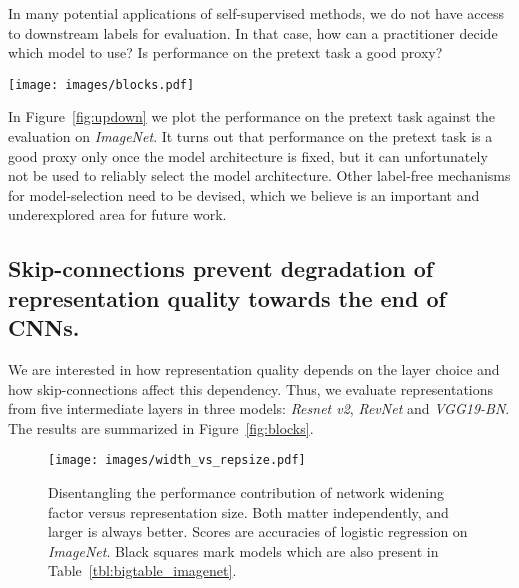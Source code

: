 \documentclass[10pt,twocolumn,letterpaper]{article}
\begin{document}
In many potential applications of self-supervised methods, we do not have access to downstream labels for evaluation.
In that case, how can a practitioner decide which model to use?
Is performance on the pretext task a good proxy?

\begin{figure*}[t]
  \begin{center}
    \texttt{[image: images/blocks.pdf]}
  \end{center}
  \caption{
     Evaluating the representation from various depths within the network.
     The vertical axis corresponds to downstream ImageNet performance in percent.
     For residual architectures, the \emph{pre-logits} are always best.
  }\label{fig:blocks}
\end{figure*}

In Figure~\ref{fig:updown} we plot the performance on the pretext task against the evaluation on \emph{ImageNet}.
It turns out that performance on the pretext task is a good proxy only once the model architecture is fixed, but it can unfortunately not be used to reliably select the model architecture.
Other label-free mechanisms for model-selection need to be devised, which we believe is an important and underexplored area for future work.

\subsection{Skip-connections prevent degradation of representation quality towards the end of CNNs.}
\label{subsec:layers}


We are interested in how representation quality depends on the layer choice and how skip-connections affect this dependency.
Thus, we evaluate representations from five intermediate layers in three models: \emph{Resnet v2}, \emph{RevNet} and \emph{VGG19-BN}.
The results are summarized in Figure~\ref{fig:blocks}.

\begin{figure}[t]
  \begin{center}
    \texttt{[image: images/width\_vs\_repsize.pdf]}
  \end{center}
  \caption{
     Disentangling the performance contribution of network widening factor versus representation size. Both matter independently, and larger is always better. Scores are accuracies of logistic regression on \emph{ImageNet}. Black squares mark models which are also present in Table~\ref{tbl:bigtable_imagenet}.
  }\label{fig:width_vs_repsize}
\end{figure}
\end{document}
